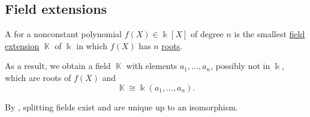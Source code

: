 \subsection{Field extensions}\label{subsec:field_extensions}

\begin{definition}\label{def:splitting_field}
  A  for a nonconstant polynomial \( f(X) \in \Bbbk[X] \) of degree \( n \) is the smallest \hyperref[def:field/submodel]{field extension} \( \BbbK \) of \( \Bbbk \) in which \( f(X) \) has \( n \) \hyperref[def:polynomial_root]{roots}.

  As a result, we obtain a field \( \BbbK \) with elements \( a_1, \ldots, a_n \), possibly not in \( \Bbbk \), which are roots of \( f(X) \) and
  \begin{equation*}
    \BbbK \cong \Bbbk(a_1, \ldots, a_n).
  \end{equation*}

  By , splitting fields exist and are unique up to an isomorphism.
\end{definition}

